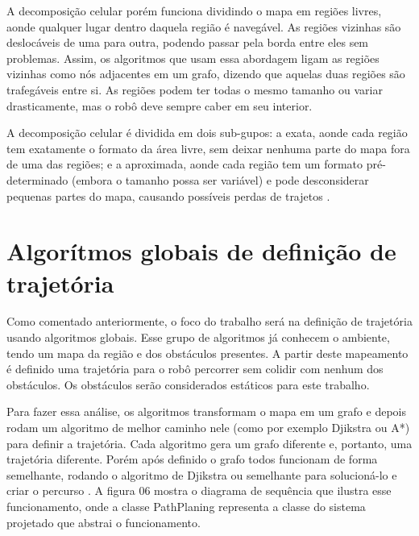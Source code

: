 A decomposição celular porém funciona dividindo o mapa em regiões livres, aonde qualquer lugar dentro daquela região é navegável. As regiões vizinhas são deslocáveis de uma para outra, podendo passar pela borda entre eles sem problemas. Assim, os algoritmos que usam essa abordagem ligam as regiões vizinhas como nós adjacentes em um grafo, dizendo que aquelas duas regiões são trafegáveis entre si. As regiões podem ter todas o mesmo tamanho ou variar drasticamente, mas o robô deve sempre caber em seu interior.

A decomposição celular é dividida em dois sub-gupos: a exata, aonde cada região tem exatamente o formato da área livre, sem deixar nenhuma parte do mapa fora de uma das regiões; e a aproximada, aonde cada região tem um formato pré-determinado (embora o tamanho possa ser variável) e pode desconsiderar pequenas partes do mapa, causando possíveis perdas de trajetos \cite{Souza2008}.

\section{Algorítmos globais de definição de trajetória}

Como comentado anteriormente, o foco do trabalho será na definição de trajetória usando algoritmos globais. Esse grupo de algoritmos já conhecem o ambiente, tendo um mapa da região e dos obstáculos presentes. A partir deste mapeamento é definido uma trajetória para o robô percorrer sem colidir com nenhum dos obstáculos. Os obstáculos serão considerados estáticos para este trabalho.

Para fazer essa análise, os algoritmos transformam o mapa em um grafo e depois rodam um algoritmo de melhor caminho nele (como por exemplo Djikstra ou A*) para definir a trajetória. Cada algoritmo gera um grafo diferente e, portanto, uma trajetória diferente. Porém após definido o grafo todos funcionam de forma semelhante, rodando o algoritmo de Djikstra ou semelhante para solucioná-lo e criar o percurso \cite{Guzman2008}. A figura 06 mostra o diagrama de sequência que ilustra esse funcionamento, onde a classe PathPlaning representa a classe do sistema projetado que abstrai o funcionamento.

